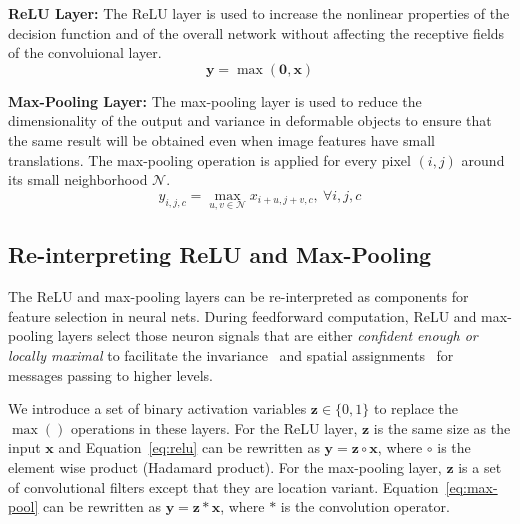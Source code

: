 \textbf{ReLU Layer:}
The ReLU layer is used to increase the nonlinear properties of the decision function and of the overall network without affecting the receptive fields of the convoluional layer.
\begin{equation}
\mathbf{y} = \max (\mathbf{0}, \mathbf{x})
\label{eq:relu}
\end{equation}

\textbf{Max-Pooling Layer:}
The max-pooling layer is used to reduce the dimensionality of the output and variance in deformable objects to ensure that the same result will be obtained even when image features have small translations. The max-pooling operation is applied for every pixel $(i,j)$ around its small neighborhood $\mathcal{N}$.
\begin{equation}
y_{i,j,c} = \max_{u,v \in \mathcal{N}} x_{i+u, j+v, c},\ \forall i, j, c
\label{eq:max-pool}
\end{equation}

\subsection{Re-interpreting ReLU and Max-Pooling}
The ReLU and max-pooling layers can be re-interpreted as components for feature selection in neural nets. During feedforward computation, ReLU and max-pooling layers select those neuron signals that are either \emph{confident enough or locally maximal} to facilitate the invariance~\cite{riesenhuber1999hierarchical} and spatial assignments~\cite{weng1992cresceptron} for messages passing to higher levels.

We introduce a set of binary activation variables $\mathbf{z} \in \{0, 1\}$ to replace the $\max()$ operations in these layers. For the ReLU layer, $\mathbf{z}$ is the same size as the input $\mathbf{x}$ and Equation~\ref{eq:relu} can be rewritten as $\mathbf{y} = \mathbf{z} \circ \mathbf{x}$, where $\circ$ is the element wise product (Hadamard product). For the max-pooling layer, $\mathbf{z}$ is a set of convolutional filters except that they are location variant. Equation~\ref{eq:max-pool} can be rewritten as $\mathbf{y} = \mathbf{z} * \mathbf{x}$, where $*$ is the convolution operator.

